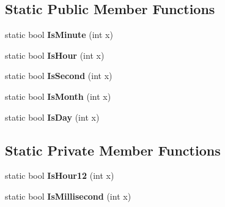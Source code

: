 \subsection*{Static Public Member Functions}
\begin{DoxyCompactItemize}
\item 
static bool {\bfseries Is\+Minute} (int x)\hypertarget{classv8_1_1internal_1_1_date_parser_1_1_b_a_s_e___e_m_b_e_d_d_e_d_ac45d4af66f8f4758a15680948bed93dd}{}\label{classv8_1_1internal_1_1_date_parser_1_1_b_a_s_e___e_m_b_e_d_d_e_d_ac45d4af66f8f4758a15680948bed93dd}

\item 
static bool {\bfseries Is\+Hour} (int x)\hypertarget{classv8_1_1internal_1_1_date_parser_1_1_b_a_s_e___e_m_b_e_d_d_e_d_a5dcecd8f17154f6eb6ee51fd8bb974ce}{}\label{classv8_1_1internal_1_1_date_parser_1_1_b_a_s_e___e_m_b_e_d_d_e_d_a5dcecd8f17154f6eb6ee51fd8bb974ce}

\item 
static bool {\bfseries Is\+Second} (int x)\hypertarget{classv8_1_1internal_1_1_date_parser_1_1_b_a_s_e___e_m_b_e_d_d_e_d_a34fd943bde52ae0714b7820e891fec18}{}\label{classv8_1_1internal_1_1_date_parser_1_1_b_a_s_e___e_m_b_e_d_d_e_d_a34fd943bde52ae0714b7820e891fec18}

\item 
static bool {\bfseries Is\+Month} (int x)\hypertarget{classv8_1_1internal_1_1_date_parser_1_1_b_a_s_e___e_m_b_e_d_d_e_d_aae76f8fd7a47f672c7e2e807cd0f1df9}{}\label{classv8_1_1internal_1_1_date_parser_1_1_b_a_s_e___e_m_b_e_d_d_e_d_aae76f8fd7a47f672c7e2e807cd0f1df9}

\item 
static bool {\bfseries Is\+Day} (int x)\hypertarget{classv8_1_1internal_1_1_date_parser_1_1_b_a_s_e___e_m_b_e_d_d_e_d_afd7025142121350329508f9e4342df85}{}\label{classv8_1_1internal_1_1_date_parser_1_1_b_a_s_e___e_m_b_e_d_d_e_d_afd7025142121350329508f9e4342df85}

\end{DoxyCompactItemize}
\subsection*{Static Private Member Functions}
\begin{DoxyCompactItemize}
\item 
static bool {\bfseries Is\+Hour12} (int x)\hypertarget{classv8_1_1internal_1_1_date_parser_1_1_b_a_s_e___e_m_b_e_d_d_e_d_a69e56cf36faad29d9b64e1c2f320a282}{}\label{classv8_1_1internal_1_1_date_parser_1_1_b_a_s_e___e_m_b_e_d_d_e_d_a69e56cf36faad29d9b64e1c2f320a282}

\item 
static bool {\bfseries Is\+Millisecond} (int x)\hypertarget{classv8_1_1internal_1_1_date_parser_1_1_b_a_s_e___e_m_b_e_d_d_e_d_a39fb6f942ce74f46464a3ab3727900e5}{}\label{classv8_1_1internal_1_1_date_parser_1_1_b_a_s_e___e_m_b_e_d_d_e_d_a39fb6f942ce74f46464a3ab3727900e5}

\end{DoxyCompactItemize}
